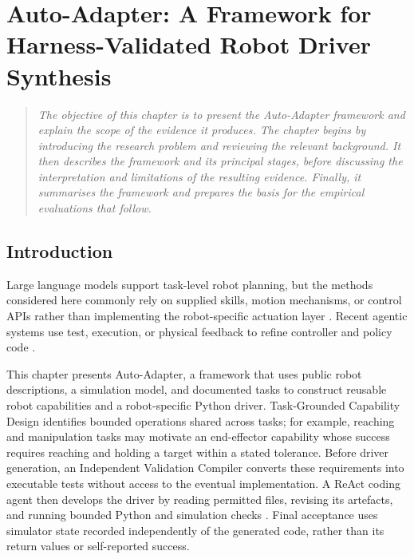 \chapter[Auto-Adapter Framework]{Auto-Adapter: A Framework for Harness-Validated Robot Driver Synthesis}
\label{chapter:autoadapter-component-analysis}

\begin{quote}\itshape
The objective of this chapter is to present the Auto-Adapter framework and
explain the scope of the evidence it produces. The chapter begins by
introducing the research problem and reviewing the relevant background. It then
describes the framework and its principal stages, before discussing the
interpretation and limitations of the resulting evidence. Finally, it
summarises the framework and prepares the basis for the empirical evaluations
that follow.
\end{quote}

\section{Introduction}

Large language models support task-level robot planning, but the methods
considered here commonly rely on supplied skills, motion mechanisms, or control
APIs rather than implementing the robot-specific actuation layer
\citep{ahn2022saycan,huang2023innermonologue,liang2023codeaspolicies}. Recent
agentic systems use test, execution, or physical feedback to refine controller
and policy code
\citep{tripathi2026testdriven,xiao2026enpire,fu2026capx,lu2026aspire}.

This chapter presents Auto-Adapter, a framework that uses public robot
descriptions, a simulation model, and documented tasks to construct reusable
robot capabilities and a robot-specific Python driver. Task-Grounded
Capability Design identifies bounded operations shared across tasks; for
example, reaching and manipulation tasks may motivate an end-effector
capability whose success requires reaching and holding a target within a stated
tolerance. Before driver generation, an Independent Validation Compiler
converts these requirements into executable tests without access to the
eventual implementation. A ReAct coding agent then develops the driver by
reading permitted files, revising its artefacts, and running bounded Python and
simulation checks \citep{yao2023react}. Final acceptance uses simulator state
recorded independently of the generated code, rather than its return values or
self-reported success.


